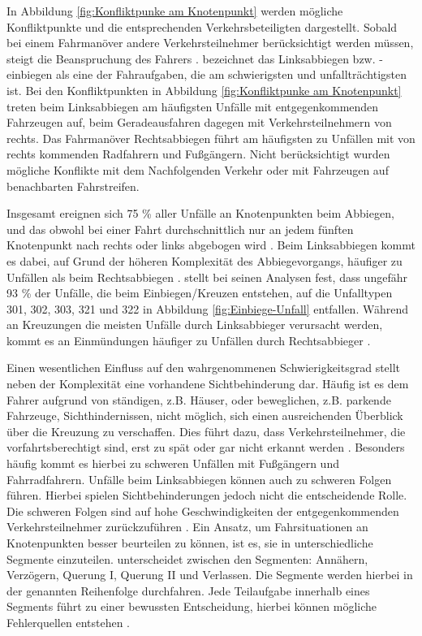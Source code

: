 In Abbildung \ref{fig:Konfliktpunke am Knotenpunkt} werden mögliche Konfliktpunkte und die entsprechenden Verkehrsbeteiligten dargestellt. Sobald bei einem Fahrmanöver andere Verkehrsteilnehmer berücksichtigt werden müssen, steigt die Beanspruchung des Fahrers \parencite[S. 9]{Mages.2008}. \Textcite[S. 84]{Reichart.2001} bezeichnet das Linksabbiegen bzw. -einbiegen als eine der Fahraufgaben, die am schwierigsten und unfallträchtigsten ist. Bei den Konfliktpunkten in Abbildung \ref{fig:Konfliktpunke am Knotenpunkt} treten beim Linksabbiegen am häufigsten Unfälle mit entgegenkommenden Fahrzeugen auf, beim Geradeausfahren dagegen mit Verkehrsteilnehmern von rechts. Das Fahrmanöver Rechtsabbiegen führt am häufigsten zu Unfällen mit von rechts kommenden Radfahrern und Fußgängern. Nicht berücksichtigt wurden mögliche Konflikte mit dem Nachfolgenden Verkehr oder mit Fahrzeugen auf benachbarten Fahrstreifen.

Insgesamt ereignen sich 75 \% aller Unfälle an Knotenpunkten beim Abbiegen, und das obwohl bei einer Fahrt durchschnittlich nur an jedem fünften Knotenpunkt nach rechts oder links abgebogen wird \parencite[S. 101f]{Gerstenberger.17.02.2015}. Beim Linksabbiegen kommt es dabei, auf Grund der höheren Komplexität des Abbiegevorgangs, häufiger zu Unfällen als beim Rechtsabbiegen \parencite[S. 117]{Grundl.2005}. \Textcite[S. 15]{Mages.2008} stellt bei seinen Analysen fest, dass ungefähr 93 \% der Unfälle, die beim Einbiegen/Kreuzen entstehen, auf die Unfalltypen 301, 302, 303, 321 und 322 in Abbildung \ref{fig:Einbiege-Unfall} entfallen. Während an Kreuzungen die meisten Unfälle durch Linksabbieger verursacht werden, kommt es an Einmündungen häufiger zu Unfällen durch Rechtsabbieger \parencite[S. 102-103] {Gerstenberger.17.02.2015}.

Einen wesentlichen Einfluss auf den wahrgenommenen Schwierigkeitsgrad stellt neben der Komplexität eine vorhandene Sichtbehinderung dar. Häufig ist es dem Fahrer aufgrund von ständigen, z.B. Häuser, oder beweglichen, z.B. parkende Fahrzeuge, Sichthindernissen, nicht möglich, sich einen ausreichenden Überblick über die Kreuzung zu verschaffen. Dies führt dazu, dass Verkehrsteilnehmer, die vorfahrtsberechtigt sind, erst zu spät oder gar nicht erkannt werden \parencite[S. 9]{Mages.2008}. Besonders häufig kommt es hierbei zu schweren Unfällen mit Fußgängern und Fahrradfahrern. Unfälle beim Linksabbiegen können auch zu schweren Folgen führen. Hierbei spielen Sichtbehinderungen jedoch nicht die entscheidende Rolle. Die schweren Folgen sind auf  hohe Geschwindigkeiten der entgegenkommenden Verkehrsteilnehmer zurückzuführen \parencite[S. 417]{AbdelAty.2005}. Ein Ansatz, um Fahrsituationen an Knotenpunkten besser beurteilen zu können, ist es, sie in unterschiedliche Segmente einzuteilen. \Textcite[S. 112]{Gerstenberger.17.02.2015} unterscheidet zwischen den Segmenten: Annähern, Verzögern, Querung I, Querung II und Verlassen. Die Segmente werden hierbei in der genannten Reihenfolge durchfahren. Jede Teilaufgabe innerhalb eines Segments führt zu einer bewussten Entscheidung, hierbei können mögliche Fehlerquellen entstehen \parencite[S. 25]{Gerstenberger.17.02.2015}. %

